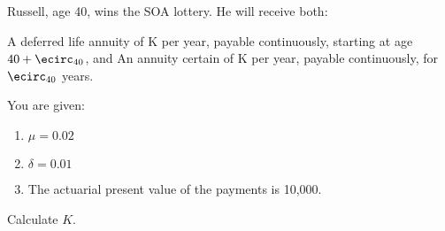 Russell, age 40, wins the SOA lottery. He will receive both:
\begin{description}
\bull A deferred life annuity of K per year, payable continuously, starting at age $40+\ecirc_{40}$, and
\bull An annuity certain of K per year, payable continuously, for $\ecirc_{40}$ years.
\end{description}
You are given:
\begin{enumerate}
\item $\mu=0.02$
\item $\delta = 0.01$
\item The actuarial present value of the payments is 10,000.
\end{enumerate}
Calculate $K.$

